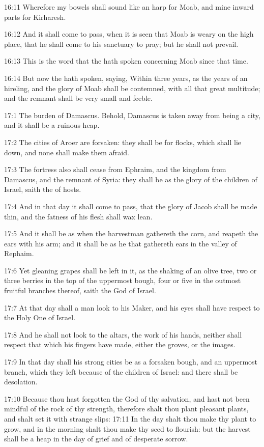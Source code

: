 16:11 Wherefore my bowels shall sound like an harp for Moab, and mine
inward parts for Kirharesh.

16:12 And it shall come to pass, when it is seen that Moab is weary on
the high place, that he shall come to his sanctuary to pray; but he
shall not prevail.

16:13 This is the word that the \LORD hath spoken concerning Moab since
that time.

16:14 But now the \LORD hath spoken, saying, Within three years, as the
years of an hireling, and the glory of Moab shall be contemned, with
all that great multitude; and the remnant shall be very small and
feeble.

17:1 The burden of Damascus. Behold, Damascus is taken away from being
a city, and it shall be a ruinous heap.

17:2 The cities of Aroer are forsaken: they shall be for flocks, which
shall lie down, and none shall make them afraid.

17:3 The fortress also shall cease from Ephraim, and the kingdom from
Damascus, and the remnant of Syria: they shall be as the glory of the
children of Israel, saith the \LORD of hosts.

17:4 And in that day it shall come to pass, that the glory of Jacob
shall be made thin, and the fatness of his flesh shall wax lean.

17:5 And it shall be as when the harvestman gathereth the corn, and
reapeth the ears with his arm; and it shall be as he that gathereth
ears in the valley of Rephaim.

17:6 Yet gleaning grapes shall be left in it, as the shaking of an
olive tree, two or three berries in the top of the uppermost bough,
four or five in the outmost fruitful branches thereof, saith the \LORD
God of Israel.

17:7 At that day shall a man look to his Maker, and his eyes shall
have respect to the Holy One of Israel.

17:8 And he shall not look to the altars, the work of his hands,
neither shall respect that which his fingers have made, either the
groves, or the images.

17:9 In that day shall his strong cities be as a forsaken bough, and
an uppermost branch, which they left because of the children of
Israel: and there shall be desolation.

17:10 Because thou hast forgotten the God of thy salvation, and hast
not been mindful of the rock of thy strength, therefore shalt thou
plant pleasant plants, and shalt set it with strange slips: 17:11 In
the day shalt thou make thy plant to grow, and in the morning shalt
thou make thy seed to flourish: but the harvest shall be a heap in the
day of grief and of desperate sorrow.

